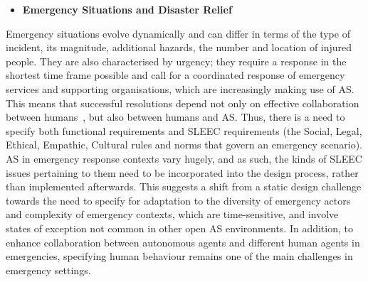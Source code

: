 \documentclass[sigconf,nonacm]{acmart}%
\begin{document}
\normalsize	


	
	\begin{itemize}[leftmargin=0.5cm]
		\item \textbf{Emergency Situations and Disaster Relief}
	\end{itemize}
	Emergency situations evolve dynamically and can differ in terms of the type of incident, its magnitude, additional hazards, the number and location of injured people. They are also characterised by urgency; they require a response in the shortest time frame possible and call for a coordinated response of emergency services and supporting organisations, which are increasingly making use of AS. This means that successful resolutions depend not only on effective collaboration between humans~\cite{james2011organizational}, but also between humans and AS. Thus, there is a need to specify both functional requirements and SLEEC requirements (the Social, Legal, Ethical, Empathic, Cultural rules and norms that govern an emergency scenario). AS in emergency response contexts vary hugely, and as such, the kinds of SLEEC issues pertaining to them need to be incorporated into the design process, rather than implemented afterwards. This suggests a shift from a static design challenge towards the need to specify for adaptation to the diversity of emergency actors and complexity of emergency contexts, which are time-sensitive, and involve states of exception not common in other open AS environments. In addition, to enhance collaboration between autonomous agents and different human agents in emergencies, specifying human behaviour remains one of the main challenges in emergency settings. 
\end{document}
